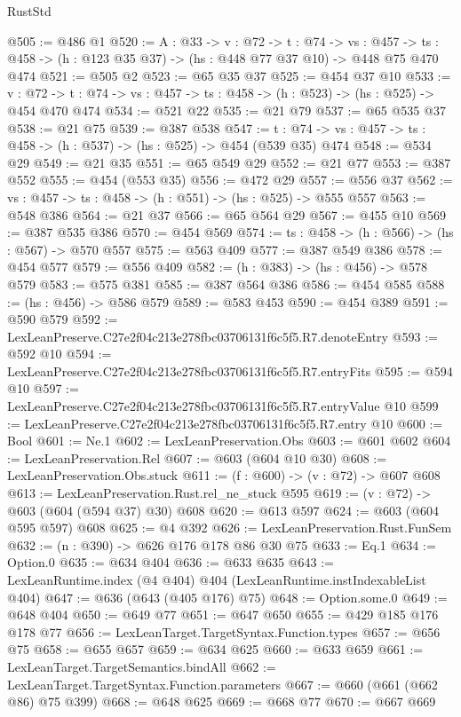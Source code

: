 \begin{lexlean}{RustStd}
\begin{coremodule}
@505 := @486 @1
@520 := {A : @33} ->
  {v : @72} ->
  {t : @74} ->
  {vs : @457} -> {ts : @458} -> (h : @123 @35 @37) -> (hs : @448 @77 @37 @10) -> @448 @75 @470 @474
@521 := @505 @2
@523 := @65 @35 @37
@525 := @454 @37 @10
@533 := {v : @72} ->
  {t : @74} -> {vs : @457} -> {ts : @458} -> (h : @523) -> (hs : @525) -> @454 @470 @474
@534 := @521 @22
@535 := @21 @79
@537 := @65 @535 @37
@538 := @21 @75
@539 := @387 @538
@547 := {t : @74} -> {vs : @457} -> {ts : @458} -> (h : @537) -> (hs : @525) -> @454 (@539 @35) @474
@548 := @534 @29
@549 := @21 @35
@551 := @65 @549 @29
@552 := @21 @77
@553 := @387 @552
@555 := @454 (@553 @35)
@556 := @472 @29
@557 := @556 @37
@562 := {vs : @457} -> {ts : @458} -> (h : @551) -> (hs : @525) -> @555 @557
@563 := @548 @386
@564 := @21 @37
@566 := @65 @564 @29
@567 := @455 @10
@569 := @387 @535 @386
@570 := @454 @569
@574 := {ts : @458} -> (h : @566) -> (hs : @567) -> @570 @557
@575 := @563 @409
@577 := @387 @549 @386
@578 := @454 @577
@579 := @556 @409
@582 := (h : @383) -> (hs : @456) -> @578 @579
@583 := @575 @381
@585 := @387 @564 @386
@586 := @454 @585
@588 := (hs : @456) -> @586 @579
@589 := @583 @453
@590 := @454 @389
@591 := @590 @579
@592 := LexLeanPreserve.C27e2f04c213e278fbc03706131f6c5f5.R7.denoteEntry
@593 := @592 @10
@594 := LexLeanPreserve.C27e2f04c213e278fbc03706131f6c5f5.R7.entryFits
@595 := @594 @10
@597 := LexLeanPreserve.C27e2f04c213e278fbc03706131f6c5f5.R7.entryValue @10
@599 := LexLeanPreserve.C27e2f04c213e278fbc03706131f6c5f5.R7.entry @10
@600 := Bool
@601 := Ne.{1}
@602 := LexLeanPreservation.Obs
@603 := @601 @602
@604 := LexLeanPreservation.Rel
@607 := @603 (@604 @10 @30)
@608 := LexLeanPreservation.Obs.stuck
@611 := (f : @600) -> (v : @72) -> @607 @608
@613 := LexLeanPreservation.Rust.rel_ne_stuck @595
@619 := (v : @72) -> @603 (@604 (@594 @37) @30) @608
@620 := @613 @597
@624 := @603 (@604 @595 @597) @608
@625 := @4 @392
@626 := LexLeanPreservation.Rust.FunSem
@632 := (n : @390) -> @626 @176 @178 @86 @30 @75
@633 := Eq.{1}
@634 := Option.{0}
@635 := @634 @404
@636 := @633 @635
@643 := LexLeanRuntime.index (@4 @404) @404 (LexLeanRuntime.instIndexableList @404)
@647 := @636 (@643 (@405 @176) @75)
@648 := Option.some.{0}
@649 := @648 @404
@650 := @649 @77
@651 := @647 @650
@655 := @429 @185 @176 @178 @77
@656 := LexLeanTarget.TargetSyntax.Function.types
@657 := @656 @75
@658 := @655 @657
@659 := @634 @625
@660 := @633 @659
@661 := LexLeanTarget.TargetSemantics.bindAll
@662 := LexLeanTarget.TargetSyntax.Function.parameters
@667 := @660 (@661 (@662 @86) @75 @399)
@668 := @648 @625
@669 := @668 @77
@670 := @667 @669

\end{coremodule}
\end{lexlean}
